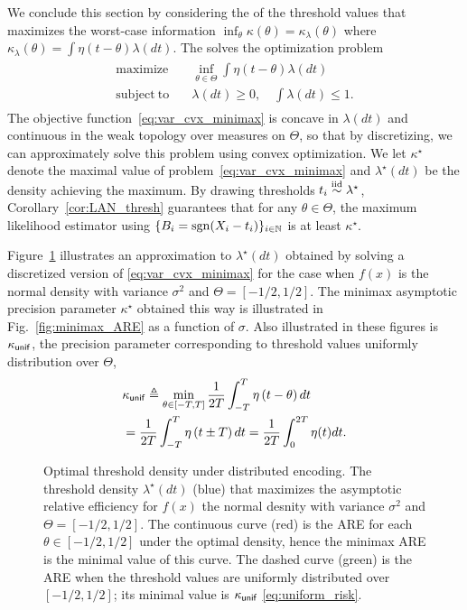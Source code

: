 We conclude this section by considering the  of the threshold values
that maximizes the worst-case information $\inf_\theta \kappa(\theta)
= \kappa_\lambda(\theta)$ where $\kappa_\lambda(\theta)
= \int \eta(t - \theta) \lambda(dt)$.
The  solves the
optimization problem
\begin{align}
  \label{eq:var_cvx_minimax}
  \begin{split}
    \mathrm{maximize} \quad &  \inf_{\theta \in \Theta} \int \eta(t-\theta) \lambda(dt)
    \\ 
    \mathrm{subject~to} 
    \quad & \lambda(dt)\geq 0,\quad \int \lambda(dt) \leq 1. 
  \end{split}
\end{align}
The objective function~\eqref{eq:var_cvx_minimax} is concave in
$\lambda(dt)$ and continuous in the weak topology over measures on $\Theta$,
so that by discretizing, we can approximately solve this problem using
convex optimization. We let $\kappa^\star$ denote the maximal value of
problem~\eqref{eq:var_cvx_minimax} and $\lambda^\star(dt)$ be the density
achieving the maximum. By drawing thresholds
$t_i \stackrel{\textup{iid}}{\sim} \lambda^\star$,
Corollary~\ref{cor:LAN_thresh} guarantees that for any $\theta \in \Theta$, the
maximum likelihood estimator
using $\{B_i = \mathrm{sgn}(X_i - t_i)\}_{i \in \mathbb{N}}$ is at least $\kappa^\star$. \par
%
Figure~\ref{fig:minimax_support} illustrates an approximation to
$\lambda^\star(dt)$ obtained by solving a discretized version of
\eqref{eq:var_cvx_minimax} for the case when $f(x)$ is the normal density
with variance $\sigma^2$ and $\Theta = [-1/2,1/2]$. The minimax asymptotic
precision parameter $\kappa^\star$ obtained this way is illustrated in
Fig.~\ref{fig:minimax_ARE} as a function of $\sigma$. Also
illustrated in these figures is $\kappa_{\mathsf{unif}}$, the precision
parameter corresponding to threshold values uniformly distribution over
$\Theta$,
\begin{align}
& \kappa_{\mathsf{unif}} \triangleq \min_{\theta \in [-T,T]} \frac{1}{2T}\int_{-T}^T \eta\left(t-\theta\right) dt \nonumber
 \\
& = 
\frac{1}{2T}\int_{-T}^{T} \eta\left(t\pm T\right) dt
= \frac{1}{2T}\int_{0}^{2T} \eta(t) dt  \label{eq:uniform_risk}. 
\end{align}


\begin{figure}
  \begin{center}

\caption{\label{fig:minimax_support}
Optimal threshold density under distributed encoding. The threshold density $\lambda^\star(dt)$ (blue) that maximizes the asymptotic relative efficiency for $f(x)$ the normal desnity with variance $\sigma^2$ and $\Theta= [-1/2,1/2]$. 
%
The continuous curve (red) is the ARE for each $\theta \in [-1/2,1/2]$ under the optimal density, hence the minimax ARE is the minimal value of this curve. The dashed curve (green) is the ARE when the threshold values are uniformly distributed over $[-1/2,1/2]$; its minimal value is $\kappa_{\mathsf{unif}}$ \eqref{eq:uniform_risk}. }
\end{center}
\end{figure}


